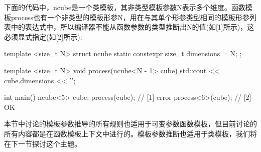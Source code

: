 \begin{itemize}
下面的代码中，ncube是一个类模板，其非类型模板参数N表示多个维度。函数模板process也有一个非类型的模板形参N，用在与其单个形参类型相同的模板形参列表中的表达式中，所以编译器不能从函数参数的类型推断出N的值(如[1]所示)，这必须显式指定(如[2]所示):

\begin{cpp}
template <size_t N>
struct ncube
{
	static constexpr size_t dimensions = N;
};

template <size_t N>
void process(ncube<N - 1> cube)
{
	std::cout << cube.dimensions << '\n';
}

int main()
{
	ncube<5> cube;
	process(cube); // [1] error
	process<6>(cube); // [2] OK
}
\end{cpp}
\end{itemize}

本节中讨论的模板参数推导的所有规则也适用于可变参数函数模板，但目前讨论的所有内容都是在函数模板上下文中进行的。模板参数推断也适用于类模板，我们将在下一节探讨这个主题。













































